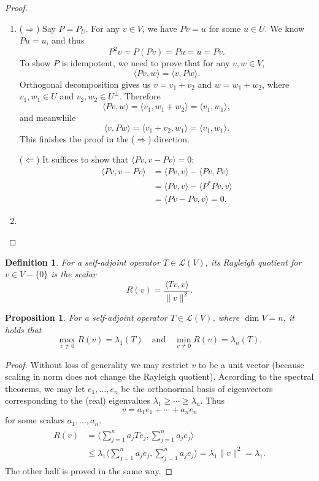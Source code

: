 \documentclass[11pt]{article}
\numberwithin{equation}{section}
\theoremstyle{plain-star}
\newtheorem{prop}[equation]{Proposition}
\theoremstyle{definition-star}
\newtheorem{defn}[equation]{Definition}
\theoremstyle{remark-star}
\theoremstyle{plain-star}
\newcommand{\la}{\langle}
\newcommand{\ra}{\rangle}
\newcommand{\inp}[2]{\langle #1, #2 \rangle}
\newcommand{\nm}[1]{\lVert #1 \rVert}
\newcommand{\LV}{\mathcal{L}(V)}
\renewcommand{\implies}{\Rightarrow}
\renewcommand{\impliedby}{\Leftarrow}
\newcommand{\df}[1]{\textit{#1}}
\begin{document}
\begin{proof}\leavevmode
    \begin{enumerate}
        \item ($\implies$) Say $P=P_U$. For any $v\in V$, we have $Pv = u$ for some $u \in U$. We know $Pu = u$, and thus \[P^2v = P(Pv) = Pu = u = Pv.\] To show $P$ is idempotent, we need to prove that for any $v,w\in V$, \[
            \inp{Pv}{w} = \inp{v}{Pw}.
        \]
        Orthogonal decomposition gives us $v = v_1 + v_2$ and $w = w_1 + w_2$, where $v_1, w_1 \in U$ and $v_2, w_2 \in U^\perp$. Therefore \[
            \inp{Pv}{w} = \inp{v_1}{w_1+w_2} = \inp{v_1}{w_1},
        \] and meanwhile \[
            \inp{v}{Pw} = \inp{v_1+v_2}{w_1} = \inp{v_1}{w_1}.
        \] This finishes the proof in the ($\implies$) direction.

        ($\impliedby$) It suffices to show that $\inp{Pv}{v - Pv} = 0$: \begin{align*}
            \inp{Pv}{v - Pv} & = \inp{Pv}{v} - \inp{Pv}{Pv} \\ 
            & = \inp{Pv}{v} - \inp{P^*Pv}{v} \\
            & = \inp{Pv - Pv}{v} = 0.
        \end{align*}
        \item  \qedhere
    \end{enumerate}
\end{proof}

\begin{defn}
    For a self-adjoint operator $T \in \LV$, its \df{Rayleigh quotient} for $v \in V - \{0\}$ is the scalar \[R(v) = \frac{\inp{Tv}{v}}{\nm{v}^2}.\]
\end{defn}

\begin{prop}\label{prop:rayleigh-eigen}
    For a self-adjoint operator $T \in \LV$, where $\dim V = n$, it holds that \[
        \max_{v \neq 0} R(v) = \lambda_1(T)\quad \text{and} \quad \min_{v \neq 0} R(v) = \lambda_n(T).
    \]
\end{prop}

\begin{proof}
    Without loss of generality we may restrict $v$ to be a unit vector (because scaling in norm does not change the Rayleigh quotient). According to the spectral theorems, we may let $e_1,\dotsc,e_n$ be the orthonormal basis of eigenvectors corresponding to the (real) eigenvalues $\lambda_1\geq\dotsb\geq\lambda_n$. Thus \[
        v = a_1 e_1 + \dotsb + a_n e_n
    \] for some scalars $a_1,\dotsc,a_n$. 
    \begin{align} \begin{split} \label{eq:rayleigh-expansion}
        R(v) & = \biggl\la \sum_{j=1}^n a_jTe_j,\sum_{j=1}^n a_je_j\biggr\ra \\
        & \leq \lambda_1 \biggl\la \sum_{j=1}^n a_je_j, \sum_{j=1}^n a_je_j\biggr\ra = \lambda_1 \nm{v}^2 = \lambda_1. \end{split}
    \end{align} 
    The other half is proved in the same way.
\end{proof}
\end{document}
